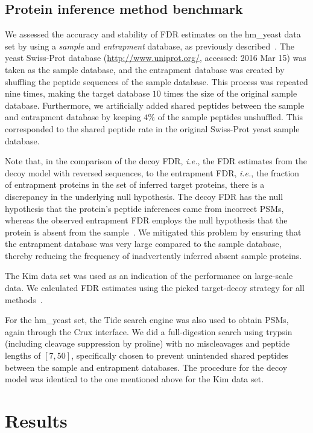 \documentclass{article}
\begin{document}
\subsection*{Protein inference method benchmark}

We assessed the accuracy and stability of FDR estimates on the
hm\_yeast data set by using a {\em sample} and {\em entrapment}
database, as previously described~\cite{granholm2013determining}. The
yeast Swiss-Prot database (\url{http://www.uniprot.org/}, accessed:
2016 Mar 15) was taken as the sample database, and the entrapment
database was created by shuffling the peptide sequences of the sample
database. This process was repeated nine times, making the target
database $10$ times the size of the original sample database.
Furthermore, we artificially added shared peptides between the sample
and entrapment database by keeping $4\%$ of the sample peptides
unshuffled. This corresponded to the shared peptide rate in the
original Swiss-Prot yeast sample database.

Note that, in the comparison of the decoy FDR, {\em i.e.}, the FDR
estimates from the decoy model with reversed sequences, to the
entrapment FDR, {\em i.e.}, the fraction of entrapment proteins in the
set of inferred target proteins, there is a discrepancy in the
underlying null hypothesis. The decoy FDR has the null hypothesis that
the protein's peptide inferences came from incorrect PSMs, whereas the
observed entrapment FDR employs the null hypothesis that the protein
is absent from the sample~\cite{the:how}. We mitigated this problem by
ensuring that the entrapment database was very large compared to the
sample database, thereby reducing the frequency of inadvertently
inferred absent sample proteins.

The Kim data set was used as an indication of the performance on
large-scale data. We calculated FDR estimates
using the picked target-decoy strategy for all
methods~\cite{savitski2015scalable}.

For the hm\_yeast set, the Tide search engine was also used to obtain
PSMs, again through the Crux interface. We did a full-digestion search
using trypsin (including cleavage suppression by proline) with no
miscleavages and peptide lengths of $[7,50]$, specifically chosen to
prevent unintended shared peptides between the sample and entrapment
databases. The procedure for the decoy model was identical to the one 
mentioned above for the Kim data set.

\section*{Results}
\end{document}
